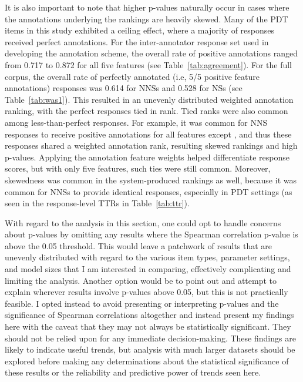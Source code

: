 It is also important to note that higher p-values naturally occur in cases where the annotations underlying the rankings are heavily skewed. Many of the PDT items in this study exhibited a ceiling effect, where a majority of responses received perfect annotations. For the inter-annotator response set used in developing the annotation scheme, the overall rate of positive annotations ranged from 0.717 to 0.872 for all five features (see Table~\ref{tab:agreement}). For the full corpus, the overall rate of perfectly annotated (i.e, 5/5 positive feature annotations) responses was 0.614 for NNSs and 0.528 for NSs (see Table~\ref{tab:was1}).
This resulted in an unevenly distributed weighted annotation ranking, with the perfect responses tied in rank. Tied ranks were also common among less-than-perfect responses. For example, it was common for NNS responses to receive positive annotations for all features except , and thus these responses shared a weighted annotation rank, resulting skewed rankings and high p-values. Applying the annotation feature weights helped differentiate response scores, but with only five features, such ties were still common. Moreover, skewedness was common in the system-produced rankings as well, because it was common for NNSs to provide identical responses, especially in  PDT settings (as seen in the response-level TTRs in Table~\ref{tab:ttr}).

With regard to the analysis in this section, one could opt to handle concerns about p-values by omitting any results where the Spearman correlation p-value is above the 0.05 threshold. This would leave a patchwork of results that are unevenly distributed with regard to the various item types, parameter settings, and model sizes that I am interested in comparing, effectively complicating and limiting the analysis. Another option would be to point out and attempt to explain wherever results involve p-values above 0.05, but this is not practically feasible. I opted instead to avoid presenting or interpreting p-values and the significance of Spearman correlations altogether and instead present my findings here with the caveat that they may not always be statistically significant. They should not be relied upon for any immediate decision-making. These findings are likely to indicate useful trends, but analysis with much larger datasets should be explored before making any determinations about the statistical significance of these results or the reliability and predictive power of trends seen here.

